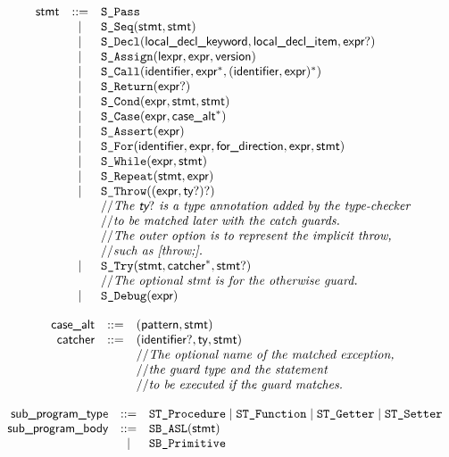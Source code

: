 \documentclass{book}
\begin{document}
\[
\begin{array}{rcl}
\textsf{stmt} &::=& \texttt{S\_Pass}\\
  &|& \texttt{S\_Seq}(\textsf{stmt}, \textsf{stmt})\\
  &|& \texttt{S\_Decl}(\textsf{local\_decl\_keyword}, \textsf{local\_decl\_item}, \textsf{expr}?)\\
  &|& \texttt{S\_Assign}(\textsf{lexpr}, \textsf{expr}, \textsf{version})\\
  &|& \texttt{S\_Call}(\textsf{identifier}, \textsf{expr}^*, (\textsf{identifier}, \textsf{expr})^*)\\
  &|& \texttt{S\_Return}(\textsf{expr}?)\\
  &|& \texttt{S\_Cond}(\textsf{expr}, \textsf{stmt}, \textsf{stmt})\\
  &|& \texttt{S\_Case}(\textsf{expr}, \textsf{case\_alt}^*)\\
  &|& \texttt{S\_Assert}(\textsf{expr})\\
  &|& \texttt{S\_For}(\textsf{identifier}, \textsf{expr}, \textsf{for\_direction}, \textsf{expr}, \textsf{stmt})\\
  &|& \texttt{S\_While}(\textsf{expr}, \textsf{stmt})\\
  &|& \texttt{S\_Repeat}(\textsf{stmt}, \textsf{expr})\\
  &|& \texttt{S\_Throw}((\textsf{expr}, \textsf{ty}?)?)\\
  & & // \textit{The $\textsf{ty}?$ is a type annotation added by the type-checker}\ \\
  & & // \textit{to be matched later with the catch guards.}\ \\
  & & // \textit{The outer option is to represent the implicit throw,}\ \\
  & & // \textit{such as [throw;].}\ \\
  &|& \texttt{S\_Try}(\textsf{stmt}, \textsf{catcher}^*, \textsf{stmt}?)\\
  & & // \textit{The optional stmt is for the otherwise guard.}\ \\
  &|& \texttt{S\_Debug}(\textsf{expr})
\end{array}
\]

\[
\begin{array}{rcl}
\textsf{case\_alt} &::=& (\textsf{pattern}, \textsf{stmt})\\
\textsf{catcher} &::=& (\textsf{identifier}?, \textsf{ty}, \textsf{stmt})\\
  & & // \textit{The optional name of the matched exception,}\ \\
  & & // \textit{the guard type and the statement}\ \\
  & & // \textit{to be executed if the guard matches.}\ \\
\end{array}
\]

\[
\begin{array}{rcl}
\textsf{sub\_program\_type} &::=& \texttt{ST\_Procedure} \;|\; \texttt{ST\_Function} \;|\; \texttt{ST\_Getter} \;|\; \texttt{ST\_Setter}\\
\textsf{sub\_program\_body} &::=& \texttt{SB\_ASL}(\textsf{stmt})\\
  &|& \texttt{SB\_Primitive}\\
\end{array}
\]
\end{document}
